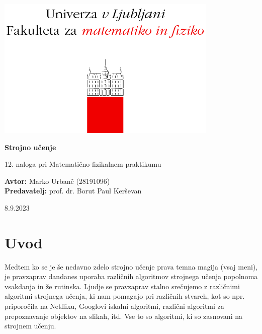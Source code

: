 \documentclass[a4paper]{article}
\begin{document}
\begin{titlepage}
    \begin{center}
        \includegraphics[]{logo.png}
        \vspace*{3cm}
        
        \Huge
        \textbf{Strojno učenje}
        
        \vspace{0.5cm}
        \large
        12. naloga pri Matematično-fizikalnem praktikumu

        \vspace{4.5cm}
        
        \textbf{Avtor:} Marko Urbanč (28191096)\ \\
        \textbf{Predavatelj:} prof. dr. Borut Paul Kerševan\ \\
        
        \vspace{2.8cm}
        
        \large
        8.9.2023
    \end{center}
\end{titlepage}
\tableofcontents
\newpage
\section{Uvod}
Medtem ko se je še nedavno zdelo strojno učenje prava temna magija (vsaj meni), je pravzaprav dandanes
uporaba različnih algoritmov strojnega učenja popolnoma vsakdanja in že rutinska. Ljudje se pravzaprav 
stalno srečujemo z različnimi algoritmi strojnega učenja, ki nam pomagajo pri različnih stvareh, kot so
npr. priporočila na Netflixu, Googlovi iskalni algoritmi, različni algoritmi za prepoznavanje objektov na
slikah, itd. Vse to so algoritmi, ki so zasnovani na strojnem učenju. \\
\end{document}
